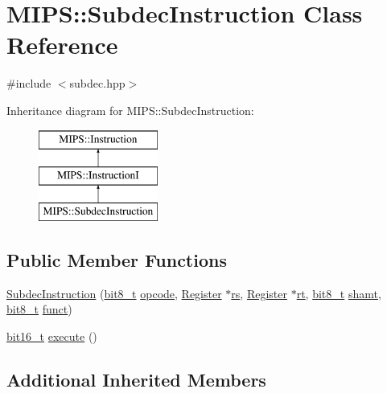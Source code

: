 \hypertarget{classMIPS_1_1SubdecInstruction}{}\section{M\+I\+PS\+:\+:Subdec\+Instruction Class Reference}
\label{classMIPS_1_1SubdecInstruction}


{\ttfamily \#include $<$subdec.\+hpp$>$}

Inheritance diagram for M\+I\+PS\+:\+:Subdec\+Instruction\+:\begin{figure}[H]
\begin{center}
\leavevmode
\includegraphics[height=3.000000cm]{classMIPS_1_1SubdecInstruction}
\end{center}
\end{figure}
\subsection*{Public Member Functions}
\begin{DoxyCompactItemize}
\item 
\hyperlink{classMIPS_1_1SubdecInstruction_add4c367579966be84f60cf36d84ae332}{Subdec\+Instruction} (\hyperlink{core_8hpp_a6074bae122ae7b527864eec42c728c3c}{bit8\+\_\+t} \hyperlink{classMIPS_1_1Instruction_a45cc6808b5dde8a5d41067d148b55476}{opcode}, \hyperlink{classMIPS_1_1Register}{Register} $\ast$\hyperlink{classMIPS_1_1InstructionI_a2be191d5b3dce505e2e626ec02eb4d62}{rs}, \hyperlink{classMIPS_1_1Register}{Register} $\ast$\hyperlink{classMIPS_1_1InstructionI_add1db07a5c954f35271de8c8a5737487}{rt}, \hyperlink{core_8hpp_a6074bae122ae7b527864eec42c728c3c}{bit8\+\_\+t} \hyperlink{classMIPS_1_1InstructionI_aa9b6da37c374c2ec8d96448d341e5e7d}{shamt}, \hyperlink{core_8hpp_a6074bae122ae7b527864eec42c728c3c}{bit8\+\_\+t} \hyperlink{classMIPS_1_1InstructionI_a5c6efcbbd233a7447c1fe24ea0a1e558}{funct})
\item 
\hyperlink{core_8hpp_adc265a970bc35995b5879784bbb3f1b7}{bit16\+\_\+t} \hyperlink{classMIPS_1_1SubdecInstruction_a6d9e86774b950a584b60d9a48402af2a}{execute} ()
\end{DoxyCompactItemize}
\subsection*{Additional Inherited Members}


